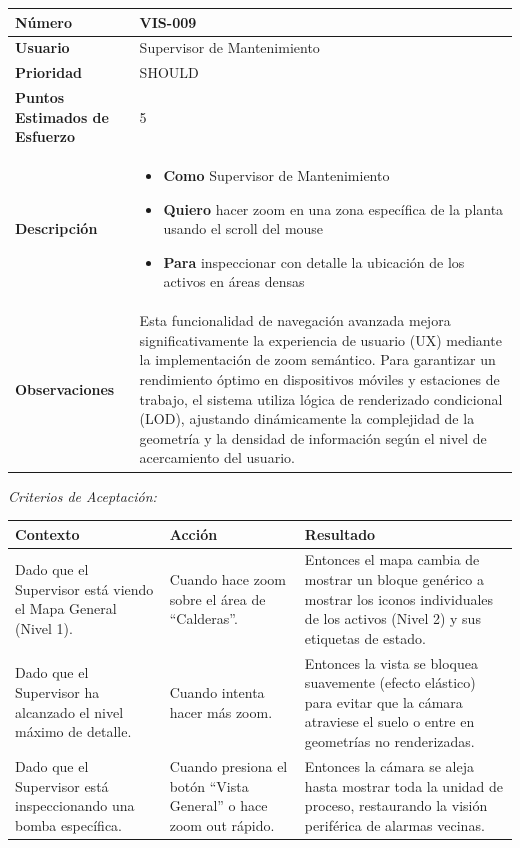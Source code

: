 \begin{longtable}{|p{0.21\textwidth}|p{0.74\textwidth}|}\hline
\textbf{Número} & VIS-009 \\ \hline
\textbf{Usuario} & Supervisor de Mantenimiento \\ \hline
\textbf{Prioridad} & SHOULD \\ \hline
\textbf{Puntos Estimados de Esfuerzo} & 5 \\ \hline
\textbf{Descripción} & \parbox[t]{\linewidth}{\vspace{2pt}\begin{itemize}[leftmargin=1.5em, nosep, topsep=0pt]
\item \textbf{Como} Supervisor de Mantenimiento
\item \textbf{Quiero} hacer zoom en una zona específica de la planta usando el scroll del mouse
\item \textbf{Para} inspeccionar con detalle la ubicación de los activos en áreas densas
\end{itemize}\vspace{2pt}} \\ \hline
\textbf{Observaciones} & Esta funcionalidad de navegación avanzada mejora significativamente la experiencia de usuario (UX) mediante la implementación de zoom semántico. Para garantizar un rendimiento óptimo en dispositivos móviles y estaciones de trabajo, el sistema utiliza lógica de renderizado condicional (LOD), ajustando dinámicamente la complejidad de la geometría y la densidad de información según el nivel de acercamiento del usuario. \\ \hline
\end{longtable}\normalsize
\noindent\textit{Criterios de Aceptación:}
\footnotesize\begin{longtable}{|p{0.28\textwidth}|p{0.32\textwidth}|p{0.34\textwidth}|}\hline
\textbf{Contexto} & \textbf{Acción} & \textbf{Resultado} \\ \hline
\parbox[t]{\linewidth}{Dado que el Supervisor está viendo el Mapa General (Nivel 1).} & \parbox[t]{\linewidth}{Cuando hace zoom sobre el área de ``Calderas''.} & \parbox[t]{\linewidth}{Entonces el mapa cambia de mostrar un bloque genérico a mostrar los iconos individuales de los activos (Nivel 2) y sus etiquetas de estado.} \\ \hline
\parbox[t]{\linewidth}{Dado que el Supervisor ha alcanzado el nivel máximo de detalle.} & \parbox[t]{\linewidth}{Cuando intenta hacer más zoom.} & \parbox[t]{\linewidth}{Entonces la vista se bloquea suavemente (efecto elástico) para evitar que la cámara atraviese el suelo o entre en geometrías no renderizadas.} \\ \hline
\parbox[t]{\linewidth}{Dado que el Supervisor está inspeccionando una bomba específica.} & \parbox[t]{\linewidth}{Cuando presiona el botón ``Vista General'' o hace zoom out rápido.} & \parbox[t]{\linewidth}{Entonces la cámara se aleja hasta mostrar toda la unidad de proceso, restaurando la visión periférica de alarmas vecinas.} \\ \hline
\end{longtable}\normalsize
